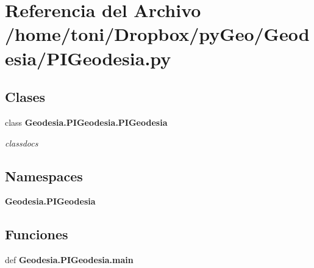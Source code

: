 \section{Referencia del Archivo /home/toni/\-Dropbox/py\-Geo/\-Geodesia/\-P\-I\-Geodesia.py}
\label{Geodesia_2PIGeodesia_8py}
\subsection*{Clases}
\begin{DoxyCompactItemize}
\item 
class {\bf Geodesia.\-P\-I\-Geodesia.\-P\-I\-Geodesia}
\begin{DoxyCompactList}\small\item\em classdocs \end{DoxyCompactList}\end{DoxyCompactItemize}
\subsection*{Namespaces}
\begin{DoxyCompactItemize}
\item 
{\bf Geodesia.\-P\-I\-Geodesia}
\end{DoxyCompactItemize}
\subsection*{Funciones}
\begin{DoxyCompactItemize}
\item 
def {\bf Geodesia.\-P\-I\-Geodesia.\-main}
\end{DoxyCompactItemize}
